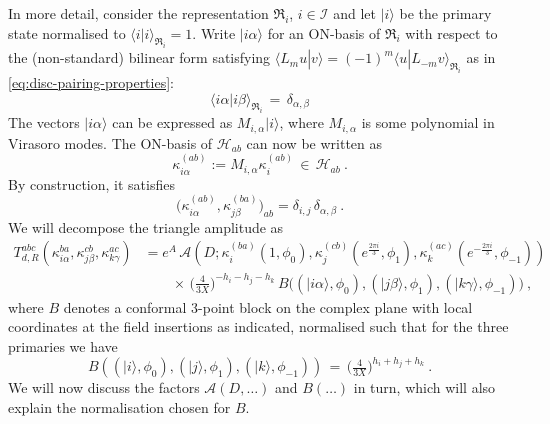 \documentclass[11pt,a4paper]{article}
\numberwithin{equation}{section}
\begin{document}
In more detail, consider the representation $\mathfrak{R}_i$, $i \in \mathcal{I}$ and let $|i\rangle$ be the primary state normalised to $\langle i | i \rangle_{\mathfrak{R}_i} = 1$. Write $|i\alpha\rangle$ for an ON-basis of $\mathfrak{R}_i$ with respect to the (non-standard) bilinear form satisfying $\langle L_m u | v \rangle = (-1)^m \langle u | L_{-m} v \rangle_{\mathfrak{R}_i}$ as in \eqref{eq:disc-pairing-properties}:
\begin{equation}\label{eq:pairing-on-desc}
	\langle i\alpha |i\beta\rangle_{\mathfrak{R}_i} \,=\, \delta_{\alpha,\beta}
\end{equation}
The vectors $|i\alpha\rangle$ can be expressed as $M_{i,\alpha} |i\rangle$, where $M_{i,\alpha}$ is some polynomial in Virasoro modes. 
The ON-basis of $\mathcal{H}_{ab}$ can now be written as
\begin{equation}\label{eq:bnd-on-basis-desc}
	\kappa^{(ab)}_{i\alpha} := M_{i,\alpha} \kappa^{(ab)}_{i} \,\in\,\mathcal{H}_{ab} \ . 
\end{equation}
By construction, it satisfies
\begin{equation}
	\big(\kappa^{(ab)}_{i\alpha},\kappa^{(ba)}_{j\beta}\big)_{ab} = \delta_{i,j}\,\delta_{\alpha,\beta} \ .
\end{equation}
We will decompose the triangle amplitude as
\begin{align}\label{eq:triangle-amplitude-with-anomaly-decomp}
    T_{d,R}^{abc}(\kappa_{i\alpha}^{ba},\kappa_{j\beta}^{cb},\kappa_{k\gamma}^{ac})
    &= e^A \, \mathcal{A}(D;\kappa^{(ba)}_i(1,\phi_0),\kappa^{(cb)}_j(e^{\frac{2 \pi i}{3}},\phi_1),\kappa^{(ac)}_k(e^{-\frac{2 \pi i}{3}},\phi_{-1}))  
    \nonumber\\
    & \qquad \times \, 
\Big(\tfrac{4}{3X}\Big)^{-h_i-h_j-h_k} \,
    B\big( (|i\alpha\rangle,\phi_0) , (|j\beta\rangle,\phi_1) ,  (|k\gamma\rangle,\phi_{-1}) \big)
    \ ,
\end{align}
where $B$ denotes a conformal 3-point block on the complex plane with local coordinates at the field insertions as indicated, normalised such that for the three primaries we have
\begin{equation}\label{eq:3pt-block-triangle-normalisation}
B( (|i\rangle,\phi_0) , (|j\rangle,\phi_1) ,  (|k\rangle,\phi_{-1}) )
\,=\,
\Big(\tfrac{4}{3X}\Big)^{h_i+h_j+h_k} \ .    
\end{equation}
We will now discuss the factors $\mathcal{A}(D,\dots)$ and $B(\dots)$ in turn, which will also explain the normalisation chosen for $B$.
\end{document}
